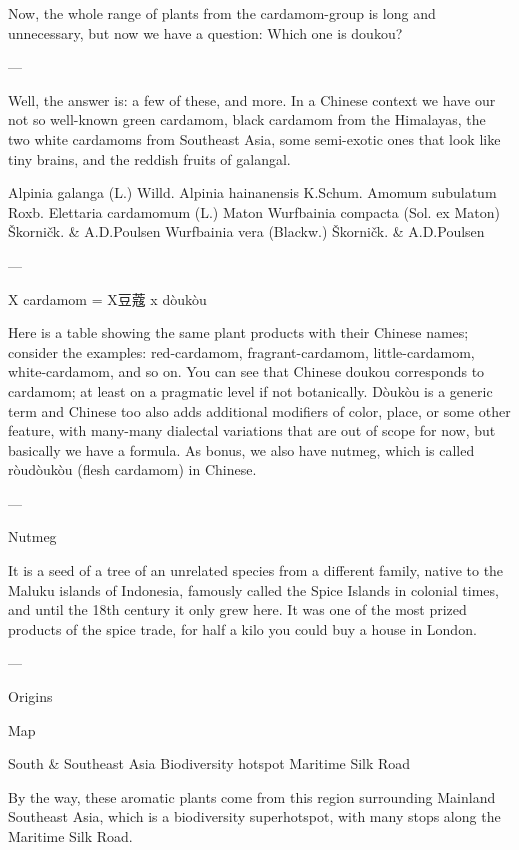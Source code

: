 \documentclass[12pt]{article}
\begin{document}
Now, the whole range of plants from the cardamom-group is long and unnecessary, but now we have a question: Which one is doukou?

---

Well, the answer is: a few of these, and more. In a Chinese context we have our not so well-known green cardamom, black cardamom from the Himalayas, the two white cardamoms from Southeast Asia, some semi-exotic ones that look like tiny brains, and the reddish fruits of galangal.

Alpinia galanga (L.) Willd. 
Alpinia hainanensis K.Schum.	
Amomum subulatum Roxb.	
Elettaria cardamomum (L.) Maton 
Wurfbainia compacta (Sol. ex Maton) Škorničk. \& A.D.Poulsen
Wurfbainia vera (Blackw.) Škorničk. \& A.D.Poulsen

---

X cardamom  = X豆蔻 x dòukòu



Here is a table showing the same plant products with their Chinese names; consider the examples: red-cardamom, fragrant-cardamom, little-cardamom, white-cardamom, and so on.
You can see that Chinese doukou corresponds to cardamom; at least on a pragmatic level if not botanically. 
Dòukòu is a generic term and Chinese too also adds additional modifiers of color, place, or some other feature, with many-many dialectal variations that are out of scope for now, but basically we have a formula.
As bonus, we also have nutmeg, which is called ròudòukòu (flesh cardamom) in Chinese.

---

Nutmeg

It is a seed of a tree of an unrelated species from a different family, native to the Maluku islands of Indonesia, famously called the Spice Islands in colonial times, and until the 18th century it only grew here. It was one of the most prized products of the spice trade, for half a kilo you could buy a house in London. 


---

Origins

Map

South \& Southeast Asia
Biodiversity hotspot
Maritime Silk Road

By the way, these aromatic plants come from this region surrounding Mainland Southeast Asia, which is a biodiversity superhotspot, with many stops along the Maritime Silk Road.
\end{document}
